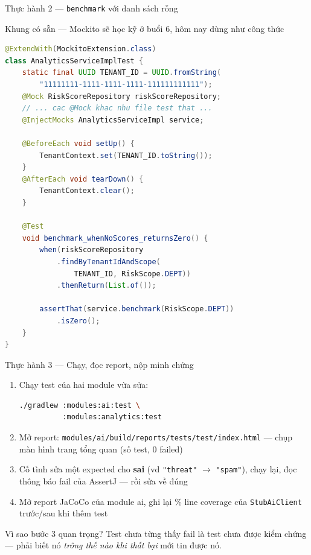 \documentclass[aspectratio=169,12pt]{beamer}
\begin{document}
\begin{frame}[fragile,shrink=12]{Thực hành 2 --- \texttt{benchmark} với danh sách rỗng}
  \begin{block}{\small Khung có sẵn --- Mockito sẽ học kỹ ở buổi 6, hôm nay dùng như công thức}
\begin{lstlisting}[language=java]
@ExtendWith(MockitoExtension.class)
class AnalyticsServiceImplTest {
    static final UUID TENANT_ID = UUID.fromString(
        "11111111-1111-1111-1111-111111111111");
    @Mock RiskScoreRepository riskScoreRepository;
    // ... cac @Mock khac nhu file test that ...
    @InjectMocks AnalyticsServiceImpl service;

    @BeforeEach void setUp() {
        TenantContext.set(TENANT_ID.toString());
    }
    @AfterEach void tearDown() {
        TenantContext.clear();
    }

    @Test
    void benchmark_whenNoScores_returnsZero() {
        when(riskScoreRepository
            .findByTenantIdAndScope(
                TENANT_ID, RiskScope.DEPT))
            .thenReturn(List.of());

        assertThat(service.benchmark(RiskScope.DEPT))
            .isZero();
    }
}
\end{lstlisting}
  \end{block}
\end{frame}

\begin{frame}[fragile,shrink=8]{Thực hành 3 --- Chạy, đọc report, nộp minh chứng}
  \begin{enumerate}
    \item Chạy test của hai module vừa sửa:
\begin{lstlisting}[language=bash,style=nonumber]
./gradlew :modules:ai:test \
          :modules:analytics:test
\end{lstlisting}
    \item Mở report:
          \texttt{modules/ai/build/reports/tests/test/index.html}
          --- chụp màn hình trang tổng quan (số test, 0 failed)
    \item Cố tình sửa một expected cho \textbf{sai}
          (vd \texttt{"threat"} \(\to\) \texttt{"spam"}), chạy lại,
          đọc thông báo fail của AssertJ --- rồi sửa về đúng
    \item Mở report JaCoCo của module ai, ghi lại \% line coverage
          của \texttt{StubAiClient} trước/sau khi thêm test
  \end{enumerate}

  \vspace{0.3em}
  \begin{exampleblock}{Vì sao bước 3 quan trọng?}
    Test chưa từng thấy fail là test chưa được kiểm chứng ---
    phải biết nó \textit{trông thế nào khi thất bại} mới tin được nó.
  \end{exampleblock}
\end{frame}
\end{document}
